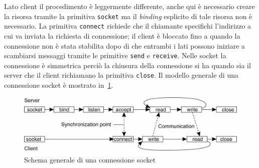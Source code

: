 Lato client il procedimento è leggermente differente, anche qui è necessario creare la risorsa tramite la primitiva \texttt{socket} ma il \emph{binding} esplicito di tale risorsa non è necessario. La primitiva \texttt{connect} richiede che il chiamante specifichi l'indirizzo a cui va inviata la richiesta di connessione; il client è bloccato fino a quando la connessione non è stata stabilita dopo di che entrambi i lati possono iniziare a scambiarsi messaggi tramite le primitive \texttt{send} e \texttt{receive}. Nelle socket la connessione è simmetrica perciò la chiusura della connessione si ha quando sia il server che il client richiamano la primitiva \texttt{close}.
Il modello generale di una connessione socket è mostrato in \figurename\,\ref{img:socket}.
\begin{figure}
\centering
\includegraphics[scale=0.35]{img/sockcon.png}
\caption{Schema generale di una connessione socket}\label{img:socket}
\end{figure}
